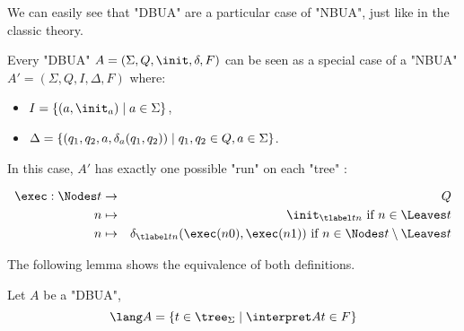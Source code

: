 \documentclass[a4paper,UKenglish,cleveref, autoref, thm-restate]{lipics-v2021}
\begin{document}
We can easily see that "DBUA" are a particular case of "NBUA", just like in the classic theory.

\begin{remark}
	Every "DBUA" $A = (\Sigma, Q, \init, \delta, F)$ can be seen as a special case of a "NBUA"
	$A' = (\Sigma, Q, I, \Delta, F)$ where:
	\begin{itemize}
		\item $I = \setdef{(a, \init_a)}{a \in \Sigma}$,
		\item $\Delta = \left\{(q_1, q_2, a, \delta_a(q_1, q_2)) \mid q_1, q_2 \in Q, a \in \Sigma\right\}$.
	\end{itemize}

	In this case, $A'$ has exactly one possible "run" on each "tree" :

	\begin{eqnarray*}
		\exec : \Nodes t &\to & Q \\
		n  &\mapsto& \init_{\tlabel t n} \text{ if } n \in \Leaves t \\
		n  &\mapsto& \delta_{\tlabel t n}(\exec (n0), \exec (n1)) \text{ if } n \in \Nodes t \setminus \Leaves t
	\end{eqnarray*}
\end{remark}


The following lemma shows the equivalence of both definitions.

\begin{lemma}
	Let $A$ be a "DBUA",
	\[ \lang A = \setdef {t \in \tree_{\Sigma}} {\interpret A t \in F} \]
\end{lemma}
\end{document}
